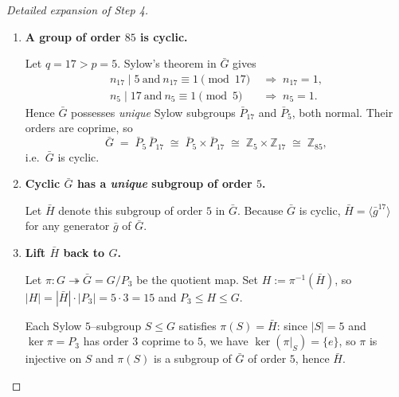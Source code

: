 \documentclass[12pt]{article}
\theoremstyle{definition} %
\theoremstyle{plain} %
\begin{document}
\begin{proof}[Detailed expansion of Step 4]
\begin{enumerate}
        Because $|P_{3}|=3$ and $P_{3}\trianglelefteq G$, the quotient
        $$
            \bar{G}\;=\;G/P_{3}
        $$
        is a group of order
        $$
            |\bar{G}| \;=\;\frac{|G|}{|P_{3}|}\;=\;\frac{255}{3}\;=\;85
            \;=\;5\cdot17.
        $$
  
  \item \textbf{A group of order $85$ is cyclic.}
  
        Let $q=17>p=5$.  
        Sylow’s theorem in $\bar{G}$ gives
        \begin{align}
            n_{17}\mid 5
            \ \text{and}\ 
            n_{17}\equiv 1\pmod{17}
            &\;\Longrightarrow\;
            n_{17}=1, \\
            n_{5}\mid 17
            \ \text{and}\ 
            n_{5}\equiv 1\pmod{5}
            &\;\Longrightarrow\;
            n_{5}=1.
        \end{align}
        Hence $\bar{G}$ possesses \emph{unique} Sylow subgroups
        $\bar{P}_{17}$ and $\bar{P}_{5}$, both normal.  
        Their orders are coprime, so
        $$
            \bar{G}\;=\;\bar{P}_{5}\,\bar{P}_{17}
            \;\cong\;
            \bar{P}_{5}\times\bar{P}_{17}
            \;\cong\;
            \mathbb{Z}_{5}\times\mathbb{Z}_{17}
            \;\cong\;
            \mathbb{Z}_{85},
        $$
        i.e.\ $\bar{G}$ is cyclic.
  
  \item \textbf{Cyclic $\bar{G}$ has a \emph{unique} subgroup of order $5$.}
  
        Let $\bar{H}$ denote this subgroup of order $5$ in $\bar{G}$.
        Because $\bar{G}$ is cyclic, $\bar{H}=\langle \bar{g}^{17}\rangle$
        for any generator $\bar{g}$ of $\bar{G}$.
  
  \item \textbf{Lift $\bar{H}$ back to $G$.}
  
        Let $\pi:G\twoheadrightarrow\bar{G}=G/P_{3}$ be the quotient map.
        Set $H:=\pi^{-1}(\bar{H})$, so
        $|H| = |\bar{H}|\cdot|P_{3}| = 5\cdot 3 = 15$
        and $P_{3}\le H\le G$.
  
        Each Sylow $5$–subgroup $S\le G$ satisfies $\pi(S)=\bar{H}$:
        since $|S|=5$ and $\ker\pi=P_{3}$ has order $3$ coprime to $5$,
        we have $\ker(\pi|_S)=\{e\}$, so $\pi$ is injective on $S$ and
        $\pi(S)$ is a subgroup of $\bar{G}$ of order $5$, hence $\bar{H}$.
  

\end{enumerate}
\end{proof}
\end{document}
